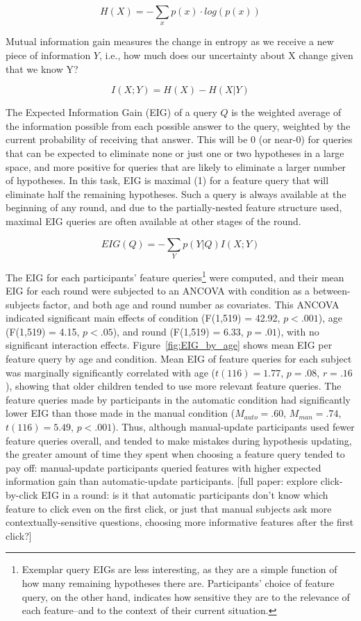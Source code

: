 \documentclass[10pt,letterpaper]{article}
\begin{document}
\begin{equation}
  H(X) = -\sum_{x} p(x) \cdot log(p(x))
\end{equation}

Mutual information gain measures the change in entropy as we receive a new piece of information $Y$, i.e., how much does our uncertainty about X change given that we know Y?

\begin{equation}
  I(X;Y) = H(X) - H(X|Y)
\end{equation}

The Expected Information Gain (EIG) of a query $Q$ is the weighted average of the information possible from each possible answer to the query, weighted by the current probability of receiving that answer. This will be 0 (or near-0) for queries that can be expected to eliminate none or just one or two hypotheses in a large space, and more positive for queries that are likely to eliminate a larger number of hypotheses. In this task, EIG is maximal (1) for a feature query that will eliminate half the remaining hypotheses. Such a query is always available at the beginning of any round, and due to the partially-nested feature structure used, maximal EIG queries are often available at other stages of the round.

\begin{equation}
  EIG(Q) = -\sum_{Y} p(Y|Q) I(X;Y)
\end{equation}

The EIG for each participants' feature queries\footnote{Exemplar query EIGs are less interesting, as they are a simple function of how many remaining hypotheses there are. Participants' choice of feature query, on the other hand, indicates how sensitive they are to the relevance of each feature--and to the context of their current situation.} were computed, and their mean EIG for each round were subjected to an ANCOVA with condition as a between-subjects factor, and both age and round number as covariates. This ANCOVA indicated significant main effects of condition (F(1,519) = 42.92, $p<.001$), age (F(1,519) = 4.15, $p<.05$), and round (F(1,519) = 6.33, $p = .01$), with no significant interaction effects. Figure~\ref{fig:EIG_by_age} shows mean EIG per feature query by age and condition. Mean EIG of feature queries for each subject was marginally significantly correlated with age ($t(116)=1.77$, $p=.08$, $r=.16$), showing that older children tended to use more relevant feature queries. The feature queries made by participants in the automatic condition had significantly lower EIG than those made in the manual condition ($M_{auto} = .60$, $M_{man} = .74$, $t(116) = 5.49$,  $p<.001$). Thus, although manual-update participants used fewer feature queries overall, and tended to make mistakes during hypothesis updating, the greater amount of time they spent when choosing a feature query tended to pay off: manual-update participants queried features with higher expected information gain than automatic-update participants. 
[full paper: explore click-by-click EIG in a round: is it that automatic participants don't know which feature to click even on the first click, or just that manual subjects ask more contextually-sensitive questions, choosing more informative features after the first click?]
\end{document}
